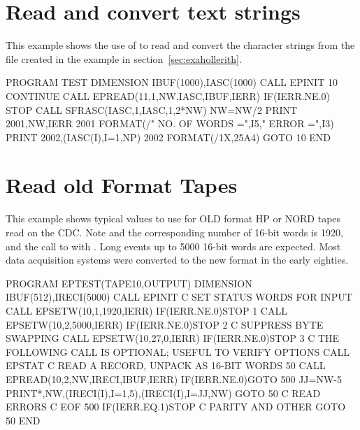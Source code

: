 \newpage


\section{Read and convert text strings}

This example shows the use of  to read and convert the 
character strings from the file created in the example in 
section~\ref{sec:exahollerith}.

\begin{XMP}
      PROGRAM TEST
      DIMENSION IBUF(1000),IASC(1000)
      CALL EPINIT
   10 CONTINUE
      CALL EPREAD(11,1,NW,IASC,IBUF,IERR)
      IF(IERR.NE.0)  STOP
      CALL SFRASC(IASC,1,IASC,1,2*NW)
      NW=NW/2
      PRINT 2001,NW,IERR
 2001 FORMAT(/" NO. OF WORDS =",I5,"  ERROR =",I3)
      PRINT 2002,(IASC(I),I=1,NP)
 2002 FORMAT(/1X,25A4)
      GOTO 10
      END
\end{XMP}
\newpage

\section{Read old Format Tapes}

This example shows typical values to use for OLD format HP or NORD
tapes read on the CDC. Note  and the corresponding number
of 16-bit words is 1920, and the call to  with . 
Long events up to 5000 16-bit words are expected. 
Most data acquisition systems were converted
to the new format in the early eighties.

\begin{XMP}
      PROGRAM EPTEST(TAPE10,OUTPUT)
      DIMENSION IBUF(512),IRECI(5000)
      CALL EPINIT
 C       SET STATUS WORDS FOR INPUT
      CALL EPSETW(10,1,1920,IERR)
      IF(IERR.NE.0)STOP 1
      CALL EPSETW(10,2,5000,IERR)
      IF(IERR.NE.0)STOP 2
 C    SUPPRESS BYTE SWAPPING
      CALL EPSETW(10,27,0,IERR)
      IF(IERR.NE.0)STOP 3
 C        THE FOLLOWING CALL IS OPTIONAL; USEFUL TO VERIFY OPTIONS
      CALL EPSTAT
 C       READ A RECORD, UNPACK AS 16-BIT WORDS
  50  CALL EPREAD(10,2,NW,IRECI,IBUF,IERR)
      IF(IERR.NE.0)GOTO 500
      JJ=NW-5
      PRINT*,NW,(IRECI(I),I=1,5),(IRECI(I),I=JJ,NW)
      GOTO 50
 C       READ ERRORS
 C         EOF
  500 IF(IERR.EQ.1)STOP
 C         PARITY AND OTHER
      GOTO 50
      END
\end{XMP}

